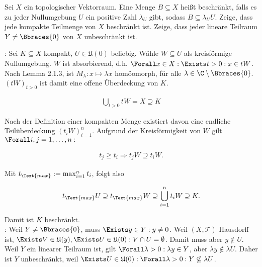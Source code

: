 \begin{exercise}

Sei $X$ ein topologischer Vektorraum.
Eine Menge $B \subseteq X$ heißt beschränkt, falls es zu jeder Nullumgebung $U$ ein positive Zahl $\lambda_U$ gibt, sodass $B \subseteq \lambda_U U$.
Zeige, dass jede kompakte Teilmenge von $X$ beschränkt ist. Zeige, dass jeder lineare Teilraum $Y \neq \Bbraces{0}$ von $X$ unbeschränkt ist.

\end{exercise}

\begin{solution}

\phantom{}

:
Sei $K \subseteq X$ kompakt, $U \in \mathfrak{U}(0)$ beliebig.
Wähle $W \subseteq U$ als kreisförmige Nullumgebung.
$W$ ist absorbierend, d.h. $\Forall x \in X: \Exists t > 0: x \in tW$.
Nach Lemma 2.1.3, ist $M_\lambda: x \mapsto \lambda x$ homöomorph, für alle $ \lambda \in \C \setminus \Bbraces{0}$.
$(tW)_{t > 0}$ ist damit eine offene Überdeckung von $K$.

\begin{align*}
  \bigcup_{t > 0} tW = X \supseteq K
\end{align*}

Nach der Definition einer kompakten Menge existiert davon eine endliche Teilüberdeckung $(t_i W)_{i=1}^n$.
Aufgrund der Kreisförmigkeit von $W$ gilt $\Forall i, j = 1, \ldots, n:$

\begin{align*}
  t_j \geq t_i
  \Rightarrow
  t_j W \supseteq t_i W.
\end{align*}

Mit $t_\Text{max} := \max_{i=1}^n t_i$, folgt also

\begin{align*}
  t_\Text{max} U
  \supseteq
  t_\Text{max} W
  \supseteq
  \bigcup_{i=1}^n t_i W
  \supseteq
  K.
\end{align*}

Damit ist $K$ beschränkt. \\

:
Weil $Y \neq \Bbraces{0}$, muss $\Exists y \in Y: y \neq 0$. Weil $(X, \mathcal{T})$ Hausdorff ist, $\Exists V \in \mathfrak{U}(y), \Exists U \in \mathfrak{U}(0): V \cap U = \emptyset$.
Damit muss aber $y \notin U$.
Weil $Y$ ein linearer Teilraum ist, gilt $\Forall \lambda > 0: \lambda y \in Y$, aber $\lambda y \notin \lambda U$.
Daher ist $Y$ unbeschränkt, weil $\Exists U \in \mathfrak{U}(0): \Forall \lambda > 0: Y \not \subseteq \lambda U$.

\end{solution}
